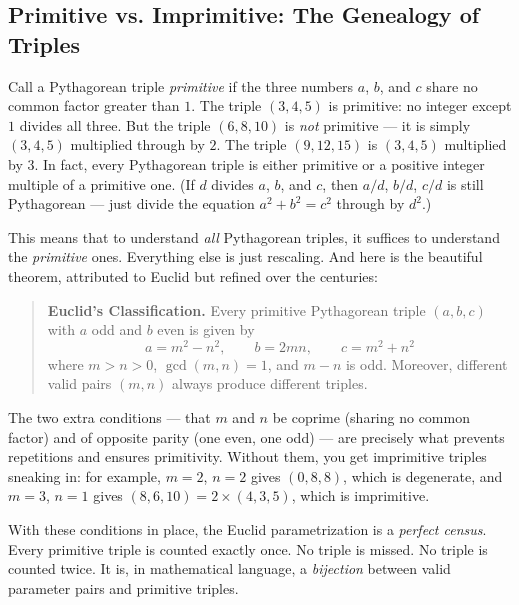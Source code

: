 \ornbreak



\subsection{Primitive vs. Imprimitive: The Genealogy of Triples}


Call a Pythagorean triple \textit{primitive} if the three numbers $a$, $b$, and $c$ share no common factor greater than $1$. The triple $(3, 4, 5)$ is primitive: no integer except $1$ divides all three. But the triple $(6, 8, 10)$ is \textit{not} primitive --- it is simply $(3, 4, 5)$ multiplied through by $2$. The triple $(9, 12, 15)$ is $(3, 4, 5)$ multiplied by $3$. In fact, every Pythagorean triple is either primitive or a positive integer multiple of a primitive one. (If $d$ divides $a$, $b$, and $c$, then $a/d$, $b/d$, $c/d$ is still Pythagorean --- just divide the equation $a^2 + b^2 = c^2$ through by $d^2$.)

This means that to understand \textit{all} Pythagorean triples, it suffices to understand the \textit{primitive} ones. Everything else is just rescaling. And here is the beautiful theorem, attributed to Euclid but refined over the centuries:

\begin{quote}
\textbf{Euclid's Classification.} Every primitive Pythagorean triple $(a, b, c)$ with $a$ odd and $b$ even is given by
$$a = m^2 - n^2, \qquad b = 2mn, \qquad c = m^2 + n^2$$
where $m > n > 0$, $\gcd(m, n) = 1$, and $m - n$ is odd. Moreover, different valid pairs $(m, n)$ always produce different triples.
\end{quote}

The two extra conditions --- that $m$ and $n$ be coprime (sharing no common factor) and of opposite parity (one even, one odd) --- are precisely what prevents repetitions and ensures primitivity. Without them, you get imprimitive triples sneaking in: for example, $m = 2$, $n = 2$ gives $(0, 8, 8)$, which is degenerate, and $m = 3$, $n = 1$ gives $(8, 6, 10) = 2 \times (4, 3, 5)$, which is imprimitive.

With these conditions in place, the Euclid parametrization is a \textit{perfect census}. Every primitive triple is counted exactly once. No triple is missed. No triple is counted twice. It is, in mathematical language, a \textit{bijection} between valid parameter pairs and primitive triples.


